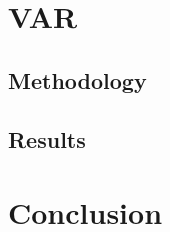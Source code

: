 \documentclass[
]{article}
\begin{document}
\section{VAR}\label{var}

\subsection{Methodology}\label{methodology-1}

\subsection{Results}\label{results-1}

\section{Conclusion}\label{conclusion}

\clearpage
\end{document}
